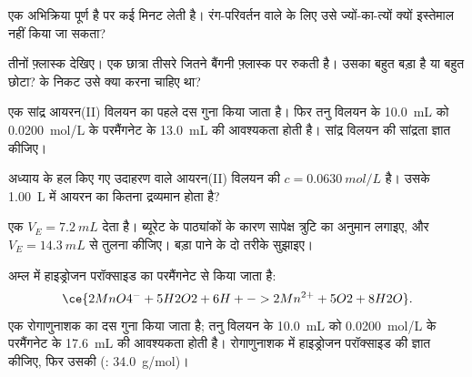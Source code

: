 \begin{exercise}[$\star\star$]\label{exo:g11:titration:8}
एक अभिक्रिया पूर्ण है पर कई मिनट लेती है। रंग-परिवर्तन वाले  के लिए
उसे ज्यों-का-त्यों क्यों इस्तेमाल नहीं किया जा सकता?
\end{exercise}

\begin{exercise}[$\star\star$]\label{exo:g11:titration:9}
तीनों फ़्लास्क देखिए। एक छात्रा तीसरे जितने बैंगनी फ़्लास्क पर रुकती है।
उसका  बहुत बड़ा है या बहुत छोटा?  के निकट
उसे क्या करना चाहिए था?
\end{exercise}

\begin{exercise}[$\star\star$]\label{exo:g11:titration:10}
एक सांद्र आयरन(II) विलयन का पहले दस गुना  किया जाता है। फिर
तनु विलयन के \qty{10.0}{mL} को \qty{0.0200}{mol/L} के परमैंगनेट के
\qty{13.0}{mL} की आवश्यकता होती है।
सांद्र विलयन की सांद्रता ज्ञात कीजिए।
\end{exercise}

\begin{exercise}[$\star\star$]\label{exo:g11:titration:11}
अध्याय के हल किए गए उदाहरण वाले आयरन(II) विलयन की
$c = \qty{0.0630}{mol/L}$ है। उसके \qty{1.00}{L} में आयरन का कितना द्रव्यमान
होता है?
\end{exercise}

\begin{exercise}[$\star\star\star$]\label{exo:g11:titration:12}
एक  $V_E = \qty{7.2}{mL}$ देता है। ब्यूरेट के पाठ्यांकों के कारण सापेक्ष
त्रुटि का अनुमान लगाइए, और $V_E = \qty{14.3}{mL}$ से तुलना कीजिए।
बड़ा  पाने के दो तरीके सुझाइए।
\end{exercise}

\begin{exercise}[$\star\star\star$]\label{exo:g11:titration:13}
अम्ल में हाइड्रोजन परॉक्साइड का  परमैंगनेट से किया जाता है:
\[
  \ce{2MnO4^- + 5H2O2 + 6H+ -> 2Mn^{2+} + 5O2 + 8H2O} .
\]
एक रोगाणुनाशक का दस गुना  किया जाता है; तनु विलयन के \qty{10.0}{mL}
को \qty{0.0200}{mol/L} के परमैंगनेट के \qty{17.6}{mL} की आवश्यकता होती है।
रोगाणुनाशक में हाइड्रोजन परॉक्साइड की  ज्ञात कीजिए,
फिर उसकी  (: \qty{34.0}{g/mol})।
\end{exercise}

